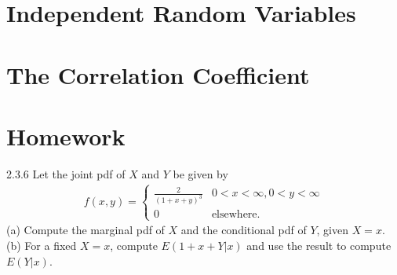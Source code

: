 \section{Independent Random Variables}

\section{The Correlation Coefficient}

\section{Homework}

\begin{exercise}{2.3.6}{}
    Let the joint pdf of $X$ and $Y$ be given by
    \begin{align*}
        f(x,y) = \left\{\begin{matrix}
            \frac{2}{(1+x+y)^3} & 0<x<\infty, 0<y<\infty\\
            0 & \text{elsewhere}.
           \end{matrix}\right.
    \end{align*}
    (a) Compute the marginal pdf of $X$ and the conditional pdf of $Y$, given $X=x$.\\
    (b) For a fixed $X=x$, compute $E(1+x+Y|x)$ and use the result to compute $E(Y|x)$.
\end{exercise}

